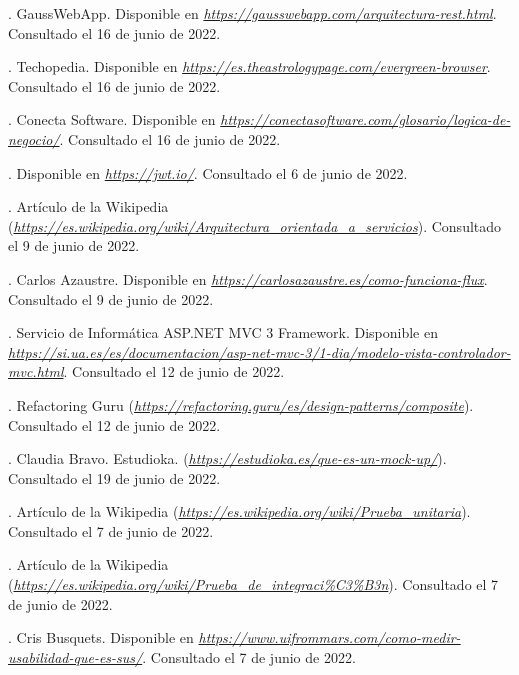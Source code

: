 \begin{thebibliography}{99}
. GaussWebApp. Disponible en {\it \url{https://gausswebapp.com/arquitectura-rest.html}}. Consultado el 16 de junio de 2022.

. Techopedia. Disponible en {\it \url{https://es.theastrologypage.com/evergreen-browser}}. Consultado el 16 de junio de 2022.

. Conecta Software. Disponible en {\it \url{https://conectasoftware.com/glosario/logica-de-negocio/}}. Consultado el 16 de junio de 2022.

. Disponible en {\it \url{https://jwt.io/}}. Consultado el 6 de junio de 2022.

. Artículo de la Wikipedia ({\it \url{https://es.wikipedia.org/wiki/Arquitectura_orientada_a_servicios}}). Consultado el 9 de junio de 2022.

. Carlos Azaustre. Disponible en {\it \url{https://carlosazaustre.es/como-funciona-flux}}. Consultado el 9 de junio de 2022.

. Servicio de Informática ASP.NET MVC 3 Framework. Disponible en {\it \url{https://si.ua.es/es/documentacion/asp-net-mvc-3/1-dia/modelo-vista-controlador-mvc.html}}. Consultado el 12 de junio de 2022.

. Refactoring Guru ({\it \url{https://refactoring.guru/es/design-patterns/composite}}). Consultado el 12 de junio de 2022.

. Claudia Bravo. Estudioka. ({\it \url{https://estudioka.es/que-es-un-mock-up/}}). Consultado el 19 de junio de 2022.

. Artículo de la Wikipedia ({\it \url{https://es.wikipedia.org/wiki/Prueba_unitaria}}). Consultado el 7 de junio de 2022.

. Artículo de la Wikipedia ({\it \url{https://es.wikipedia.org/wiki/Prueba_de_integraci%C3%B3n}}). Consultado el 7 de junio de 2022.

. Cris Busquets. Disponible en {\it \url{https://www.uifrommars.com/como-medir-usabilidad-que-es-sus/}}. Consultado el 7 de junio de 2022.


\end{thebibliography}
